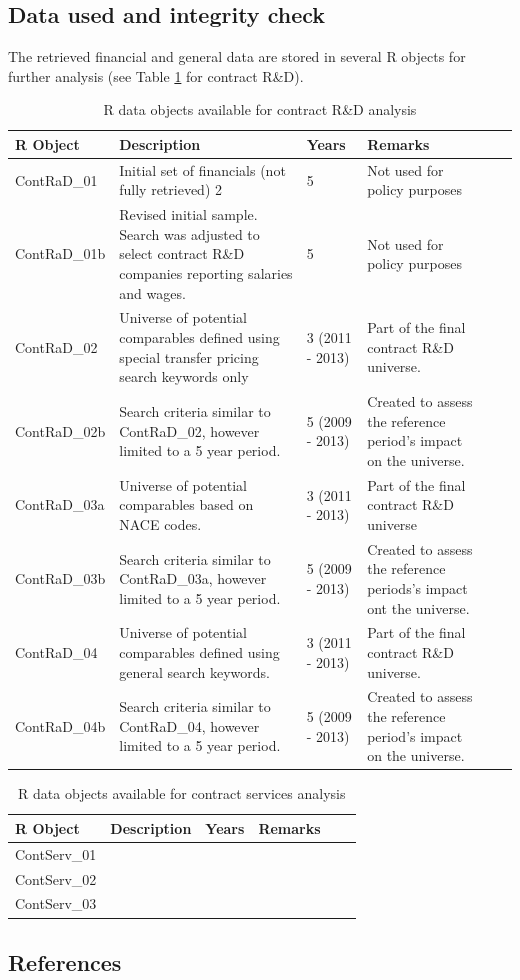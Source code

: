 \documentclass[12pt]{article}
\begin{document}
\subsection{Data used and integrity check}
The retrieved financial and general data are stored in several R objects for further analysis (see Table \ref{RObjCRaD} for contract R\&D). 
\begin{table}[!hbtp]
\begin{tabularx}{1.0\textwidth}{|l|X|X|X|X|c}
\hline R Object & Description & Years & Remarks\\
\hline
\small ContRaD\_01 & \small Initial set of financials (not fully retrieved) 2 & \small 5 & \small Not used for policy purposes\\
\small ContRaD\_01b & \small Revised initial sample. Search was adjusted to select contract R\&D companies reporting salaries and wages.& 5 & \small Not used for policy purposes\\
\small ContRaD\_02 & \small Universe of potential comparables defined using special transfer pricing search keywords only & \small 3 (2011 - 2013) & \small Part of the final contract R\&D universe.\\
\small ContRaD\_02b & \small Search criteria similar to ContRaD\_02, however limited to a 5 year period. & \small 5 (2009 - 2013) & \small Created to assess the reference period's impact on the universe.\\
\small ContRaD\_03a & \small Universe of potential comparables based on NACE codes. & \small 3 (2011 - 2013) & \small Part of the final contract R\&D universe\\
\small ContRaD\_03b & \small Search criteria similar to ContRaD\_03a, however limited to a 5 year period. & \small 5 (2009 - 2013) & \small Created to assess the reference periods's impact ont the universe.\\
\small ContRaD\_04 & \small Universe of potential comparables defined using general search keywords. & \small 3 (2011 - 2013) & \small Part of the final contract R\&D universe.\\
\small ContRaD\_04b & \small Search criteria similar to ContRaD\_04, however limited to a 5 year period. & \small 5 (2009 - 2013) & \small Created to assess the reference period's impact on the universe.\\
\hline
\end{tabularx}
\caption{\footnotesize R data objects available for contract R\&D analysis}
\label{RObjCRaD}
\end{table}
\begin{table}[!hbtp]
\begin{tabularx}{1.0\textwidth}{|l|X|X|X|X|c}
\hline R Object & Description & Years & Remarks\\
\hline
\small ContServ\_01\\
\small ContServ\_02\\
\small ContServ\_03\\
\hline
\end{tabularx}
\caption{\footnotesize R data objects available for contract services analysis}
\label{RObjCServ}
\end{table}
\subsection{References}


\end{document}
